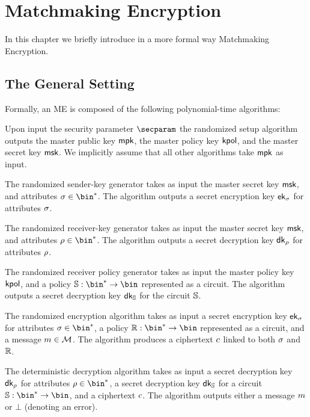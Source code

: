 \chapter{Matchmaking Encryption}
In this chapter we briefly introduce in a more formal way Matchmaking Encryption.

\section{The General Setting}
Formally, an ME is composed of the following polynomial-time algorithms:
\begin{description}\label{syntax:me}
    \item[$\setup(\secparam)$:] Upon input the security parameter $\secparam$ the randomized setup algorithm outputs the master public key $\mathsf{mpk}$, the master policy key $\mathsf{kpol}$, and the master secret key $\mathsf{msk}$.
          We implicitly assume that all other algorithms take $\mathsf{mpk}$ as input.
    \item[$\skgen(\msk, \sattr)$:] The randomized sender-key generator takes as input the master secret key $\mathsf{msk}$, and attributes $\sattr\in\bin^*$. The algorithm outputs a secret encryption key $\mathsf{ek}_{\sigma}$ for attributes $\sigma$.
    \item[$\rkgen(\msk, \rattr)$:] The randomized receiver-key generator takes as input the master secret key $\mathsf{msk}$, and attributes $\rattr\in\bin^*$. The algorithm outputs a secret decryption key $\mathsf{dk}_{\rho}$ for attributes $\rho$.
    \item[$\polgen(\kpol, \saccess)$:] The randomized receiver policy generator takes as input the master policy key $\mathsf{kpol}$, and a policy $\saccess:\allowbreak\bin^*\rightarrow\bin$ represented as a circuit. The algorithm outputs a secret decryption key $\mathsf{dk}_{\mathbb{S}}$ for the circuit $\mathbb{S}$.
    \item[$\enc(\ek_{\sattr}, \raccess, \msg)$:] The randomized encryption algorithm takes as input a secret encryption key $\mathsf{ek}_{\sigma}$ for attributes $\sattr \in \bin^*$, a policy $\raccess:\bin^*\rightarrow\bin$ represented as a circuit, and a message $m\in\mathcal{M}$. The algorithm produces a ciphertext $c$ linked to both $\sigma$ and $\mathbb{R}$.
    \item[$\dec(\dk_{\rattr}, \dk_{\saccess}, \cipher)$:] The deterministic decryption algorithm takes as input a secret decryption key $\mathsf{dk}_{\rho}$ for attributes $\rattr \in \bin^*$, a secret decryption key $\mathsf{dk}_{\mathbb{S}}$ for a circuit $\saccess:\bin^*\rightarrow\bin$, and a ciphertext $c$.
          The algorithm outputs either a message $m$ or  $\bot$ (denoting an error).
\end{description}

